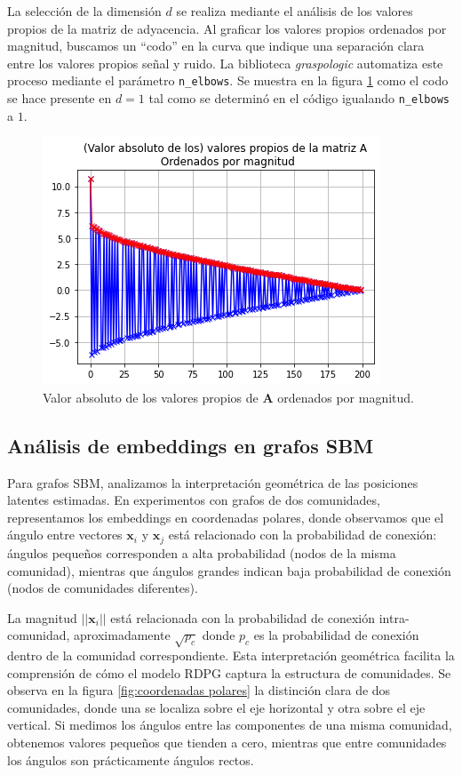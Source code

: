 \documentclass{article}
\begin{document}
La selección de la dimensión $d$ se realiza mediante el análisis de los valores propios de la matriz de adyacencia. Al graficar los valores propios ordenados por magnitud, buscamos un ``codo'' en la curva que indique una separación clara entre los valores propios señal y ruido. La biblioteca \textit{graspologic} automatiza este proceso mediante el parámetro \verb|n_elbows|. Se muestra en la figura \ref{fig:valores propios} como el codo se hace presente en $d=1$ tal como se determinó en el código igualando \verb|n_elbows| a $1$. 

\begin{figure}[htb]
    \centering
    \includegraphics[width=0.7\linewidth]{images/valores_propios.png}
    \caption{Valor absoluto de los valores propios de $\mathbf{A}$ ordenados por magnitud.}
    \label{fig:valores propios}
\end{figure}

\subsection{Análisis de embeddings en grafos SBM}

Para grafos SBM, analizamos la interpretación geométrica de las posiciones latentes estimadas. En experimentos con grafos de dos comunidades, representamos los embeddings en coordenadas polares, donde observamos que el ángulo entre vectores $\mathbf{x}_i$ y $\mathbf{x}_j$ está relacionado con la probabilidad de conexión: ángulos pequeños corresponden a alta probabilidad (nodos de la misma comunidad), mientras que ángulos grandes indican baja probabilidad de conexión (nodos de comunidades diferentes).

La magnitud $||\mathbf{x}_i||$ está relacionada con la probabilidad de conexión intra-comunidad, aproximadamente $\sqrt{p_c}$ donde $p_c$ es la probabilidad de conexión dentro de la comunidad correspondiente. Esta interpretación geométrica facilita la comprensión de cómo el modelo RDPG captura la estructura de comunidades. Se observa en la figura \ref{fig:coordenadas polares} la distinción clara de dos comunidades, donde una se localiza sobre el eje horizontal y otra sobre el eje vertical. Si medimos los ángulos entre las componentes de una misma comunidad, obtenemos valores pequeños que tienden a cero, mientras que entre comunidades los ángulos son prácticamente ángulos rectos.
\end{document}
